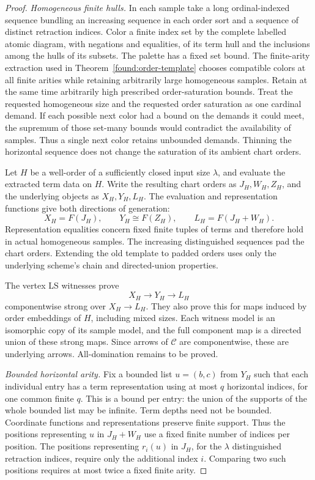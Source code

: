 \begin{proof}
\par\medskip\noindent\textit{Homogeneous finite hulls.}\quad
In each sample take a long ordinal-indexed sequence bundling an
increasing sequence in each order sort and a sequence of distinct
retraction indices.  Color a finite index set by the complete
labelled atomic diagram, with negations and equalities, of its term
hull and the inclusions among the hulls of its subsets.  The palette
has a fixed set bound.  The finite-arity extraction used in
Theorem~\ref{found:order-template} chooses compatible colors at
all finite arities while retaining arbitrarily large homogeneous
samples.  Retain at the same time arbitrarily high prescribed
order-saturation bounds.  Treat the requested homogeneous size
and the requested order saturation as one cardinal demand.
If each possible next color had a bound on the demands it could
meet, the supremum of those set-many bounds would contradict
the availability of samples.  Thus a single next color retains
unbounded demands.  Thinning the horizontal sequence does not
change the saturation of its ambient chart orders.

Let \(H\) be a well-order of a sufficiently closed input size
\(\lambda\), and evaluate the extracted term data on \(H\).
Write the resulting chart orders as \(J_H,W_H,Z_H\), and the
underlying objects as \(X_H,Y_H,L_H\).  The evaluation and
representation functions give both directions of generation:
\[
       X_H=F(J_H),\qquad Y_H\cong F(Z_H),\qquad
       L_H=F(J_H+W_H).
\]
Representation equalities concern fixed finite tuples of terms
and therefore hold in actual homogeneous samples.  The increasing
distinguished sequences pad the chart orders.  Extending the old
template to padded orders uses only the underlying scheme's chain
and directed-union properties.

The vertex LS witnesses prove
\[
                    X_H\longrightarrow Y_H\longrightarrow L_H
\]
componentwise strong over \(X_H\to L_H\).  They also prove this
for maps induced by order embeddings of \(H\), including mixed
sizes.  Each witness model is an isomorphic copy of its sample
model, and the full component map is a directed union of these
strong maps.  Since arrows of \(\mathcal C\) are componentwise,
these are underlying arrows.  All-domination remains to be proved.

\par\medskip\noindent\textit{Bounded horizontal arity.}\quad
Fix a bounded list \(u=(b,c)\) from \(Y_H\) such that each
individual entry has a term representation using at most
\(q\) horizontal indices, for one common finite \(q\).
This is a bound per entry: the union of the supports of
the whole bounded list may be infinite.
Term depths need not be bounded.  Coordinate functions and representations
preserve finite support.  Thus the positions representing \(u\)
in \(J_H+W_H\) use a fixed finite number of indices per position.
The positions representing \(r_i(u)\) in \(J_H\), for the
\(\lambda\) distinguished retraction indices, require only the
additional index \(i\).  Comparing two such positions requires
at most twice a fixed finite arity.


\end{proof}
